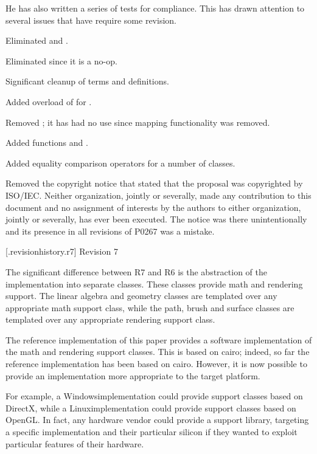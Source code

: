 \pnum
He has also written a series of tests for compliance. This has drawn attention to several issues that have require some revision.

\pnum
Eliminated  and .

\pnum
Eliminated  since it is a no-op.

\pnum
Significant cleanup of terms and definitions.

\pnum
Added overload of  for .

\pnum
Removed ; it has had no use since mapping functionality was removed.

\pnum
Added functions  and .

\pnum
Added equality comparison operators for a number of classes.

\pnum
Removed the copyright notice that stated that the proposal was copyrighted by ISO/IEC. Neither organization, jointly or severally, made any contribution to this document and no assignment of interests by the authors to either organization, jointly or severally, has ever been executed. The notice was there unintentionally and its presence in all revisions of P0267 was a mistake.

 [\iotwod.revisionhistory.r7] {Revision 7}

\pnum
The significant difference between R7 and R6 is the abstraction of the implementation into separate classes. These classes provide math and rendering support. The linear algebra and geometry classes are templated over any appropriate math support class, while the path, brush and surface classes are templated over any appropriate rendering support class.

\pnum
The reference implementation of this paper provides a software implementation of the math and rendering support classes. This is based on cairo; indeed, so far the reference implementation has been based on cairo. However, it is now possible to provide an implementation more appropriate to the target platform.

\pnum
For example, a Windows\textregistered implementation could provide support classes based on DirectX\textregistered, while a Linux\textregistered implementation could provide support classes based on OpenGL\textregistered. In fact, any hardware vendor could provide a support library, targeting a specific implementation and their particular silicon if they wanted to exploit particular features of their hardware.

